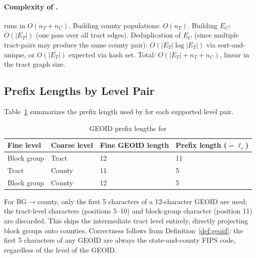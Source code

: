 \paragraph{Complexity of \buildc{}.}
\derive{} runs in $O(n_T + n_C)$.
Building county populations: $O(n_T)$.
Building $E_C$: $O(|E_T|)$ (one pass over all tract edges).
Deduplication of $E_C$ (since multiple tract-pairs may produce the same
county pair): $O(|E_T| \log |E_T|)$ via sort-and-unique, or $O(|E_T|)$
expected via hash set.
Total: $O(|E_T| + n_T + n_C)$, linear in the tract graph size.

\subsection{Prefix Lengths by Level Pair}

Table~\ref{tab:prefix} summarizes the prefix length used by \derive{}
for each supported level pair.

\begin{table}[h]
\centering
\caption{GEOID prefix lengths for \derive{}}
\label{tab:prefix}
\begin{tabular}{llll}
\toprule
Fine level & Coarse level & Fine GEOID length & Prefix length ($= \ell_c$) \\
\midrule
Block group & Tract  & 12 & 11 \\
Tract       & County & 11 & 5  \\
Block group & County & 12 & 5  \\
\bottomrule
\end{tabular}
\end{table}

\noindent
For BG$\to$county, only the first 5 characters of a 12-character GEOID
are used; the tract-level characters (positions 5--10) and block-group
character (position 11) are discarded.
This skips the intermediate tract level entirely, directly projecting block
groups onto counties.
Correctness follows from Definition~\ref{def:geoid}: the first 5 characters
of any GEOID are always the state-and-county FIPS code, regardless of the
level of the GEOID.
